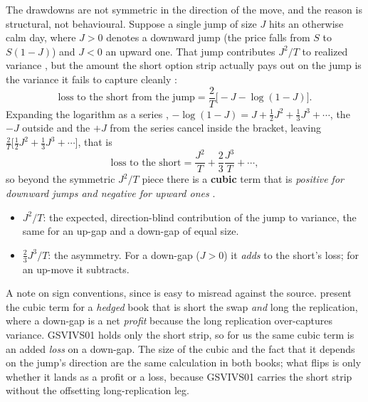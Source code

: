 The drawdowns are not symmetric in the direction of the move, and the reason is structural, not behavioural. Suppose a single jump of size $J$ hits an otherwise calm day, where $J>0$ denotes a downward jump (the price falls from $S$ to $S(1-J)$) and $J<0$ an upward one. That jump contributes $J^2/T$ to realized variance \citep[Eq.~38, p.~30]{Demeterfi1999}, but the amount the short option strip actually pays out on the jump is the variance it fails to capture cleanly \citep[Eq.~39, p.~30]{Demeterfi1999}:
\begin{equation}
\label{eq:gsvivs:jumploss}
\text{loss to the short from the jump} = \frac{2}{T}\big[-J - \log(1 - J)\big].
\end{equation}
Expanding the logarithm as a series \citep[Eq.~41, p.~30]{Demeterfi1999}, $-\log(1-J) = J + \tfrac12 J^2 + \tfrac13 J^3 + \cdots$, the $-J$ outside and the $+J$ from the series cancel inside the bracket, leaving $\tfrac{2}{T}\big[\tfrac12 J^2 + \tfrac13 J^3 + \cdots\big]$, that is
\begin{equation}
\label{eq:gsvivs:cubic}
\text{loss to the short} = \frac{J^2}{T} + \frac{2}{3}\frac{J^3}{T} + \cdots,
\end{equation}
so beyond the symmetric $J^2/T$ piece there is a \textbf{cubic} term that is \emph{positive for downward jumps and negative for upward ones} \citep[Eq.~42, p.~31]{Demeterfi1999}.
\begin{itemize}
  \item $J^2/T$: the expected, direction-blind contribution of the jump to variance, the same for an up-gap and a down-gap of equal size.
  \item $\tfrac23 J^3/T$: the asymmetry. For a down-gap ($J>0$) it \emph{adds} to the short's loss; for an up-move it subtracts.
\end{itemize}
A note on sign conventions, since  is easy to misread against the source. \citet[Eq.~42, Table~5]{Demeterfi1999} present the cubic term for a \emph{hedged} book that is short the swap \emph{and} long the replication, where a down-gap is a net \emph{profit} because the long replication over-captures variance. GSVIVS01 holds only the short strip, so for us the same cubic term is an added \emph{loss} on a down-gap. The size of the cubic and the fact that it depends on the jump's direction are the same calculation in both books; what flips is only whether it lands as a profit or a loss, because GSVIVS01 carries the short strip without the offsetting long-replication leg.

